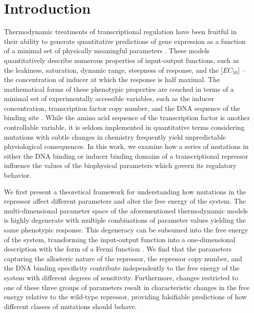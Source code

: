\section{Introduction}
Thermodynamic treatments of transcriptional regulation have been
fruitful in their ability to generate quantitative predictions of
gene expression as a function of a minimal set of physically meaningful
parameters \cite{Ackers1982, Buchler2003, Vilar2003, Garcia2011,
Daber2011a,Brewster2014, Weinert2014, Rydenfelt2014, Razo-Mejia2014,
Razo-Mejia2018, Bintu2005, Bintu2005a, Kuhlman2007}. These models
quantitatively describe numerous properties of input-output functions, such
as the leakiness, saturation, dynamic range, steepness of response, and
the [$EC_{50}$] -- the concentration of inducer at which the response is half
maximal. The mathematical forms of these phenotypic properties are couched in
terms of a minimal set of experimentally accessible variables, such as the
inducer concentration, transcription factor copy number, and the DNA sequence
of the binding site \cite{Razo-Mejia2018}. While the amino acid sequence of
the transcription factor is another controllable variable, it is
seldom implemented in quantitative terms considering mutations with subtle changes
in chemistry frequently yield unpredictable physiological
consequences. In this work, we examine how a series of
mutations in either the DNA binding or inducer binding domains of a
transcriptional repressor influence the values of the biophysical parameters
which govern its regulatory behavior.

We first present a theoretical framework for understanding how mutations in
the repressor affect different parameters and alter the free energy of the
system. The multi-dimensional parameter space of the aforementioned
thermodynamic models is highly degenerate with multiple combinations of
parameter values yielding the same phenotypic response. This degeneracy can
be subsumed into the free energy of the system, transforming the input-output
function into a one-dimensional description with the form of a Fermi function \cite{Swem2008,Keymer2006}.
 We find that the parameters capturing the allosteric nature of
the repressor, the repressor copy number, and the DNA binding specificity contribute
independently to the free energy of the system with different degrees of
sensitivity. Furthermore, changes restricted to one of these
three groups of parameters result in characteristic changes in the free
energy relative to the wild-type repressor, providing falsifiable
predictions of how different classes of mutations should behave.

